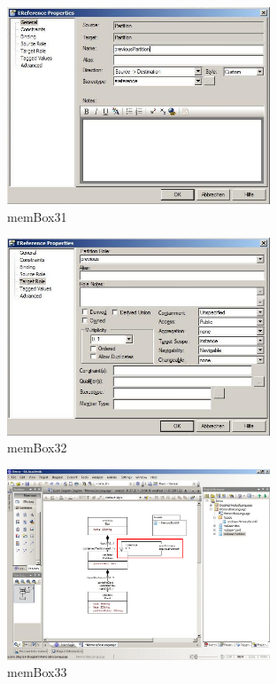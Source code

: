 \begin{figure}[htbp]
	\centering
  \includegraphics[width=0.7\textwidth]{pics/memBox31.png}
	\caption{memBox31}
	\label{memBox31}
\end{figure}

\begin{figure}[htbp]
	\centering
  \includegraphics[width=0.7\textwidth]{pics/memBox32.png}
	\caption{memBox32}
	\label{memBox32}
\end{figure}

\begin{figure}[htbp]
	\centering
  \includegraphics[width=0.7\textwidth]{pics/memBox33.png}
	\caption{memBox33}
	\label{memBox33}
\end{figure}

